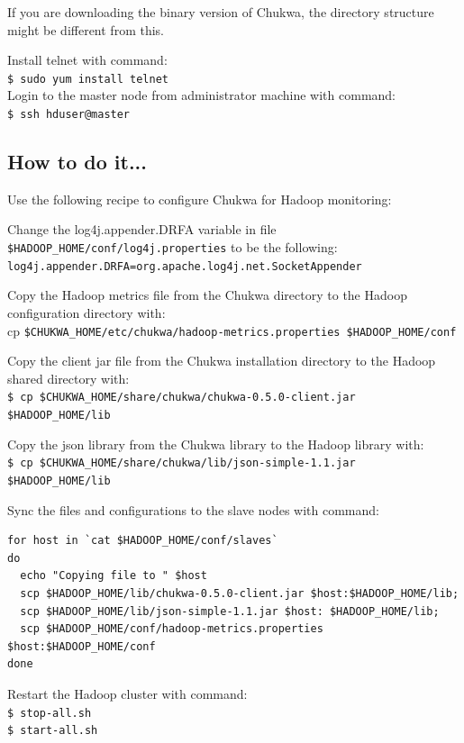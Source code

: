 
If you are downloading the binary version of Chukwa, the directory structure might be different from this.

Install telnet with command: \\
\verb|$ sudo yum install telnet| \\

Login to the master node from administrator machine with command: \\
\verb|$ ssh hduser@master|

\subsection*{How to do it...}
Use the following recipe to configure Chukwa for Hadoop monitoring:

Change the log4j.appender.DRFA variable in file \verb|$HADOOP_HOME/conf/log4j.properties| to be the following: \\
\verb|log4j.appender.DRFA=org.apache.log4j.net.SocketAppender|

Copy the Hadoop metrics file from the Chukwa directory to the Hadoop configuration directory with: \\
cp \verb|$CHUKWA_HOME/etc/chukwa/hadoop-metrics.properties $HADOOP_HOME/conf|

Copy the client jar file from the Chukwa installation directory to the Hadoop shared directory with:\\
\verb|$ cp $CHUKWA_HOME/share/chukwa/chukwa-0.5.0-client.jar $HADOOP_HOME/lib|

Copy the json library from the Chukwa library to the Hadoop library with: \\
\verb|$ cp $CHUKWA_HOME/share/chukwa/lib/json-simple-1.1.jar $HADOOP_HOME/lib|

Sync the files and configurations to the slave nodes with command: 
\begin{verbatim}
for host in `cat $HADOOP_HOME/conf/slaves`
do
  echo "Copying file to " $host
  scp $HADOOP_HOME/lib/chukwa-0.5.0-client.jar $host:$HADOOP_HOME/lib;
  scp $HADOOP_HOME/lib/json-simple-1.1.jar $host: $HADOOP_HOME/lib;
  scp $HADOOP_HOME/conf/hadoop-metrics.properties $host:$HADOOP_HOME/conf
done
\end{verbatim}

Restart the Hadoop cluster with command: \\
\verb|$ stop-all.sh| \\
\verb|$ start-all.sh|

